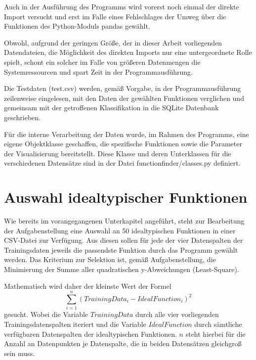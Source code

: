 Auch in der Ausführung des Programms wird vorerst noch einmal der direkte Import versucht und erst im Falle eines Fehlschlages der Umweg über die Funktionen des Python-Moduls pandas gewählt.

Obwohl, aufgrund der geringen Größe, der in dieser Arbeit vorliegenden Datendateien, die Möglichkeit des direkten Imports nur eine untergeordnete Rolle spielt, schont ein solcher im Falle von größeren Datenmengen die Systemressourcen und spart Zeit in der Programmausführung.

Die Testdaten (test.csv) werden, gemäß Vorgabe, in der Programmausführung zeilenweise eingelesen, mit den Daten der gewählten Funktionen verglichen und gemeinsam mit der getroffenen Klassifikation in die SQLite Datenbank geschrieben.

Für die interne Verarbeitung der Daten wurde, im Rahmen des Programms, eine eigene Objektklasse geschaffen, die spezifische Funktionen sowie die Parameter der Visualisierung bereitstellt. Diese Klasse und deren Unterklassen für die verschiedenen Datensätze sind in der Datei functionfinder/classes.py definiert.

\section{Auswahl idealtypischer Funktionen}

Wie bereits im vorangegangenen Unterkapitel angeführt, steht zur Bearbeitung der Aufgabenstellung eine Auswahl an 50 idealtypischen Funktionen in einer CSV-Datei zur Verfügung. Aus diesen sollen für jede der vier Datenspalten der Trainingsdaten jeweils die passendste Funktion durch das Programm gewählt werden. Das Kriterium zur Selektion ist, gemäß Aufgabenstellung, die Minimierung der Summe aller quadratischen y-Abweichungen (Least-Square).

Mathematisch wird daher der kleinste Wert der Formel
\begin{equation}  
\sum_{i=1}^{n}(TrainingData_{i} - IdealFunction_{i})^2
\label{leastsquare}
\end{equation}
gesucht. Wobei die Variable $TrainingData$ durch alle vier vorliegenden Trainingsdatenspalten iteriert und die Variable $IdealFunction$ durch sämtliche verfügbaren Datenspalten der idealtypischen Funktionen. $n$ steht hierbei für die Anzahl an Datenpunkten je Datenspalte, die in beiden Datensätzen gleichgroß sein muss. 

